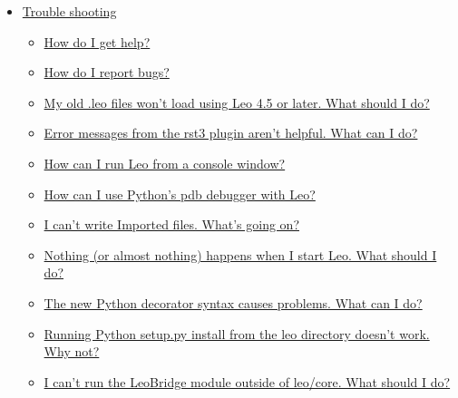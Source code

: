 \documentclass[a4paper,10pt,english]{sphinxmanual}
\begin{document}
{\begin{minipage}{0.95\linewidth}
\begin{itemize}
\begin{itemize}
\begin{itemize}
\item {} 
{\hyperref[FAQ:how-can-i-use-bibtex-citations-from-leo]{How can I use BibTeX citations from Leo?}}

\end{itemize}

\item {} 
{\hyperref[FAQ:trouble-shooting]{Trouble shooting}}
\begin{itemize}
\item {} 
{\hyperref[FAQ:how-do-i-get-help]{How do I get help?}}

\item {} 
{\hyperref[FAQ:how-do-i-report-bugs]{How do I report bugs?}}

\item {} 
{\hyperref[FAQ:my-old-leo-files-won-t-load-using-leo-4-5-or-later-what-should-i-do]{My old .leo files won't load using Leo 4.5 or later. What should I do?}}

\item {} 
{\hyperref[FAQ:error-messages-from-the-rst3-plugin-aren-t-helpful-what-can-i-do]{Error messages from the rst3 plugin aren't helpful. What can I do?}}

\item {} 
{\hyperref[FAQ:how-can-i-run-leo-from-a-console-window]{How can I run Leo from a console window?}}

\item {} 
{\hyperref[FAQ:how-can-i-use-python-s-pdb-debugger-with-leo]{How can I use Python's pdb debugger with Leo?}}

\item {} 
{\hyperref[FAQ:i-can-t-write-imported-files-what-s-going-on]{I can't write Imported files.  What's going on?}}

\item {} 
{\hyperref[FAQ:id1]{Nothing (or almost nothing) happens when I start Leo.  What should I do?}}

\item {} 
{\hyperref[FAQ:the-new-python-decorator-syntax-causes-problems-what-can-i-do]{The new Python decorator syntax causes problems.  What can I do?}}

\item {} 
{\hyperref[FAQ:id2]{Running Python setup.py install from the leo directory doesn't work.  Why not?}}

\item {} 
{\hyperref[FAQ:i-can-t-run-the-leobridge-module-outside-of-leo-core-what-should-i-do]{I can't run the LeoBridge module outside of leo/core.  What should I do?}}


\end{itemize}
\end{itemize}
\end{itemize}
\end{minipage}}
\end{document}
